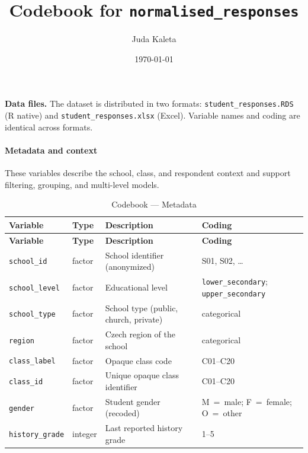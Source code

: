 \documentclass[11pt,a4paper]{article}
\title{Codebook for \texttt{normalised\_responses}}
\author{Juda Kaleta}
\date{\today}
\begin{document}
\maketitle

\textbf{Data files.} The dataset is distributed in two formats:
\texttt{student\_responses.RDS} (R native) and
\texttt{student\_responses.xlsx} (Excel).
Variable names and coding are identical across formats.

\smallskip

\paragraph{Metadata and context}
These variables describe the school, class, and respondent context and support filtering, grouping, and multi-level models.

{\small
\begin{longtable}{p{3cm} p{1.5cm} p{5.5cm} p{4cm}}
\caption{Codebook --- Metadata}\\
\toprule
\textbf{Variable} & \textbf{Type} & \textbf{Description} & \textbf{Coding}\\
\midrule
\endfirsthead
\toprule
\textbf{Variable} & \textbf{Type} & \textbf{Description} & \textbf{Coding}\\
\midrule
\endhead
\bottomrule
\endfoot

\texttt{school\_id}     & factor  & School identifier (anonymized) & S01, S02, \dots \\
\texttt{school\_level}  & factor  & Educational level & \texttt{lower\_secondary}; \texttt{upper\_secondary} \\
\texttt{school\_type}   & factor  & School type (public, church, private) & categorical \\
\texttt{region}         & factor  & Czech region of the school & categorical \\
\texttt{class\_label}   & factor  & Opaque class code & C01--C20 \\
\texttt{class\_id}      & factor  & Unique opaque class identifier & C01--C20 \\
\texttt{gender}         & factor  & Student gender (recoded) & M~=~male; F~=~female; O~=~other \\
\texttt{history\_grade} & integer & Last reported history grade & 1--5 \\
\end{longtable}
}
\end{document}
